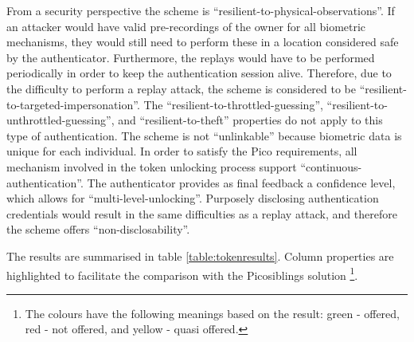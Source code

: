 From a security perspective the scheme is ``resilient-to-physical-observations''. If an attacker would have valid pre-recordings of the owner for all biometric mechanisms, they would still need to perform these in a location considered safe by the authenticator. Furthermore, the replays would have to be performed periodically in order to keep the authentication session alive. Therefore, due to the difficulty to perform a replay attack, the scheme is considered to be ``resilient-to-targeted-impersonation''. The ``resilient-to-throttled-guessing'', ``resilient-to-unthrottled-guessing'', and ``resilient-to-theft'' properties do not apply to this type of authentication. The scheme is not ``unlinkable'' because biometric data is unique for each individual. In order to satisfy the Pico requirements, all mechanism involved in the token unlocking process support ``continuous-authentication''. The authenticator provides as final feedback a confidence level, which allows for ``multi-level-unlocking''. Purposely disclosing authentication credentials would result in the same difficulties as a replay attack, and therefore the scheme offers ``non-disclosability''.

The results are summarised in table \ref{table:tokenresults}. Column properties are highlighted to facilitate the comparison with the Picosiblings solution \footnote{The colours have the following meanings based on the result: green - offered, red - not offered, and yellow - quasi offered.}.

